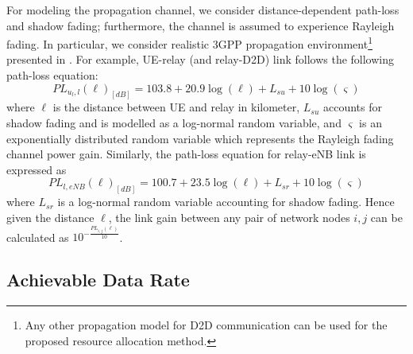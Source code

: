 \documentclass[twocolumn,10pt]{IEEEtran}
\begin{document}
For modeling the  propagation channel, we consider distance-dependent path-loss and shadow fading; furthermore, the channel is assumed to  experience Rayleigh fading. In particular, we consider realistic 3GPP propagation environment\footnote{Any other propagation model for D2D communication can be used for the proposed resource allocation method.} presented in \cite{relay-book-2}. For example, UE-relay (and relay-D2D) link follows the following path-loss equation: 
\begin{equation}
PL_{u_l,l}(\ell)_{[dB]} = 103.8 + 20.9 \log(\ell) + L_{su} + 10 \log(\varsigma)
\end{equation}
where $\ell$ is the distance between UE and relay in kilometer, $L_{su}$ accounts for shadow fading and is modelled as a log-normal random variable, and $\varsigma$ is an exponentially distributed random variable which represents the Rayleigh fading channel power gain. Similarly, the path-loss equation for relay-eNB link is expressed as \begin{equation}
PL_{l,eNB}(\ell)_{[dB]} = 100.7 + 23.5 \log(\ell) + L_{sr} + 10 \log(\varsigma)
\end{equation} 
where $L_{sr}$ is a log-normal random variable accounting for shadow fading. Hence given the distance $\ell$, the link gain between any pair of network nodes $i, j$ can be calculated as $10^{-\frac{PL_{i,j}(\ell)}{10}}$.

\subsection{Achievable Data Rate}
\end{document}
